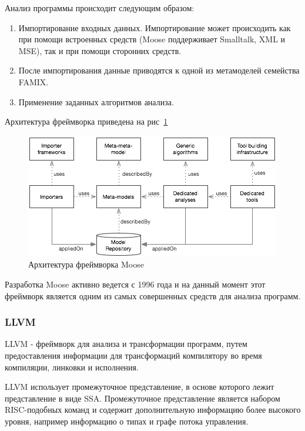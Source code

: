\newpage
Анализ программы происходит следующим образом:

\begin{enumerate}
    \item Импортирование входных данных. Импортирование может происходить как
    при помощи встроенных средств (Moose поддерживает Smalltalk, XML и MSE),
    так и при помощи сторонних средств.
    \item После импортирования данные приводятся к одной из метамоделей
    семейства FAMIX.
    \item Применение заданных алгоритмов анализа.
\end{enumerate}

Архитектура фреймворка приведена на рис~\ref{fig:moose_architecture}

\begin{figure}[h!]
    \begin{center}
        \includegraphics[]{img/moose_architecture.png}
    \end{center}
    \caption{Архитектура фреймворка Moose}
    \label{fig:moose_architecture}
\end{figure}

Разработка Moose активно ведется с 1996 года и на данный момент этот фреймворк
является одним из самых совершенных средств для анализа программ.

\subsubsection{LLVM} %

LLVM - фреймворк для анализа и трансформации программ, путем предоставления
информации для трансформаций компилятору во время компиляции, линковки и
исполнения.

LLVM использует промежуточное представление, в основе которого лежит
представление в виде SSA. Промежуточное представление является набором
RISC-подобных команд и содержит дополнительную информацию более высокого уровня,
например информацию о типах и графе потока управления.

